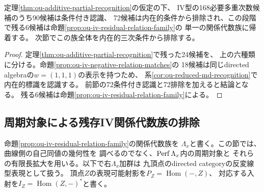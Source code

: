 \begin{corollary}[IV型の認識の残存範囲]
\label{cor:ou-iv-six-residual}
定理\ref{thm:ou-additive-partial-recognition}の仮定の下、
IV型の168必要多重次数候補のうち90候補は条件付き認識、
72候補は内在的条件から排除され、この段階で残る6候補は命題\ref{prop:ou-iv-residual-relation-family}の
単一の関係代数族に帰着する。
次節でこの族全体を内在的三次条件から排除する。
\end{corollary}
\begin{proof}
定理\ref{thm:ou-additive-partial-recognition}で残った24候補を、
上の六種類に分ける。命題\ref{prop:ou-iv-negative-relation-matches}の
18候補は同じdirected algebraの$w=(1,1,1)$の表示を持つため、
系\ref{cor:ou-reduced-md-recognition}で内在的標識を認識する。
前節の72条件付き認識と72排除を加えると結論となる。
残る6候補は命題\ref{prop:ou-iv-residual-relation-family}による。
\end{proof}

\subsection{周期対象による残存IV関係代数族の排除}
\label{subsec:ou-iv-periodic-obstruction}

命題\ref{prop:ou-iv-residual-relation-family}の関係代数族を
$\Lambda_x$と書く。この節では、曲線側の自己同値の幾何性を
調べるのでなく、$\operatorname{Perf}\Lambda_x$内の周期対象と
それらの有限長拡大を用いる。以下で右$\Lambda_x$加群は
九頂点のdirected categoryの反変線型表現として扱う。
頂点$Z$の表現可能射影を$P_Z=\operatorname{Hom}(-,Z)$、
対応する入射を$I_Z=\operatorname{Hom}(Z,-)^*$と書く。

